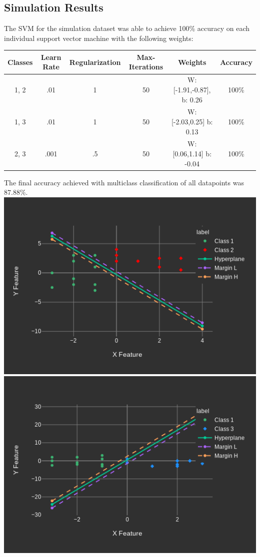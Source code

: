 \documentclass[12pt]{article}%
\begin{document}
	\subsection{Simulation Results}
	The SVM for the simulation dataset was able to achieve 100\% accuracy on each individual support vector machine with the following weights:\\
	\begin{center}
		\begin{tabular}{||c c c c c c||} 
			\hline
			Classes & Learn Rate & Regularization & Max-Iterations & Weights & Accuracy\\ [0.5ex] 
			\hline\hline
			1, 2 & .01 & 1 & 50 & W: [-1.91,-0.87], b: 0.26 & 100\% \\ 
			\hline
			1, 3 & .01 & 1 & 50 & W: [-2.03,0.25] b: 0.13 & 100\% \\
			\hline
			2, 3 & .001 & .5 & 50 & W: [0.06,1.14] b: -0.04 &100\% \\ [1ex] 
			\hline
		\end{tabular}
	\end{center}
	The final accuracy achieved with multiclass classification of all datapoints was 87.88\%.
	\\
	\includegraphics[scale=.3]{./sim1.png}
	\includegraphics[scale=.3]{./sim2.png}
\end{document}
